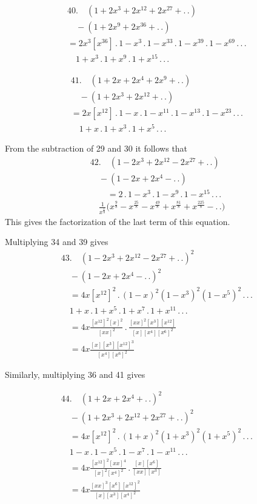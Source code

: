 \[
\begin{gathered}
40.\quad (1+2x^3+2x^{12}+2x^{27}+ .\,.)\\[8pt]\quad{}-(1+2x^9+2x^{36}+ .\,.)\\[8pt]
=2x^3[x^{36}]\,.\,1-x^3\,.\,1-x^{33}\,.\,1-x^{39}\,.\,1-x^{69}\,.\,.\,.\,\\[8pt]\quad{}
1+x^3\,.\,1+x^9\,.\,1+x^{15}\,.\,.\,.
\end{gathered}
\]

\[
\begin{gathered}
41.\quad (1+2x+2x^4+2x^9+ .\,.)\\[8pt]\quad{}-(1+2x^3+2x^{12}+ .\,.)\\[8pt]
=2x[x^{12}]\,.\,1-x\,.\,1-x^{11}\,.\,1-x^{13}\,.\,1-x^{23}\,.\,.\,.\,\\[8pt]\quad{}
1+x\,.\,1+x^3\,.\,1+x^5\,.\,.\,.
\end{gathered}
\]

From the subtraction of 29 and 30 it follows that
\[
\begin{gathered}
42.\quad (1-2x^3+2x^{12}-2x^{27}+ .\,.)\\[8pt]\quad{}-(1-2x+2x^4- .\,.)\\[8pt]
\qquad=2\,.\,1-x^3\,.\,1-x^9\,.\,1-x^{15}\,.\,.\,.\,
\\[8pt]\quad{}\frac{1}{x^{\frac18}}\bigl(x^{\frac98}-x^{\frac{25}{8}}-x^{\frac{49}{8}}+x^{\frac{81}{8}}+x^{\frac{225}{8}}- .\,.\bigr)
\end{gathered}
\]
This gives the factorization of the last term of this equation.


Multiplying 34 and 39 gives
\[
\begin{gathered}
43.\quad (1-2x^3+2x^{12}-2x^{27}+ .\,.)^2\\[8pt]\quad{}-(1-2x+2x^4- .\,.)^2\\[8pt]
\quad=4x[x^{12}]^2\,.\,(1-x)^2(1-x^3)^2(1-x^5)^2\,.\,.\,.\,\\[8pt]\quad{}
1+x\,.\,1+x^5\,.\,1+x^7\,.\,1+x^{11}\,.\,.\,.\\[8pt]
\quad=4x\frac{[x^{12}]^2[x]^2}{[xx]^2}\,.\,
\frac{[xx]^2[x^3][x^{12}]}{[x][x^4][x^6]^2}
\\[8pt]\quad{}=4x\frac{[x][x^3][x^{12}]^3}{[x^4][x^6]^2}
\end{gathered}
\]

Similarly, multiplying 36 and 41 gives

\[
\begin{gathered}
44.\quad (1+2x+2x^4+ .\,.)^2\\[8pt]\quad{}-(1+2x^3+2x^{12}+2x^{27}+ .\,.)^2\\[8pt]
\quad=4x[x^{12}]^2\,.\,(1+x)^2(1+x^3)^2(1+x^5)^2\,.\,.\,.\,\\[8pt]\quad{}
1-x\,.\,1-x^5\,.\,1-x^7\,.\,1-x^{11}\,.\,.\,.\\[8pt]
\quad=4x\frac{[x^{12}]^2[xx]^4}{[x]^2[x^4]^2}\,.\,
\frac{[x][x^6]}{[xx][x^3]}
\\[8pt]\quad{}=4x\frac{[xx]^3[x^6][x^{12}]^2}{[x][x^3][x^4]^2}
\end{gathered}
\]

